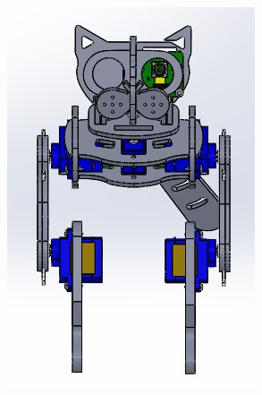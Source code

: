 \documentclass[runningheads,a4paper,12pt]{report}
\begin{document}
\begin{figure}[H]
	\centering
	\begin{subfigure}{.3\textwidth}
  		\centering
  		\includegraphics[width=\linewidth]{./images/3_hard_face}
  		\caption{}
  		\label{fig:3_frontal}
  	\end{subfigure} 
  	\hfill  
  	\begin{subfigure}{.2\textwidth}
  		\centering

\end{subfigure}
\end{figure}
\end{document}
